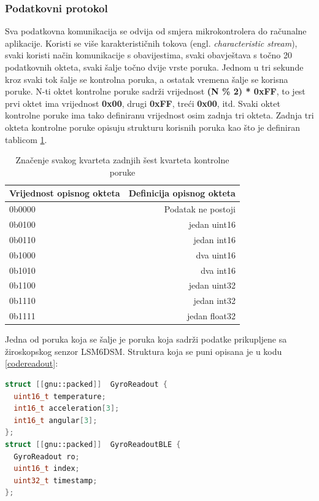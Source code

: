 \documentclass[times, utf8, diplomski]{diplomski}
\begin{document}
\subsubsection{Podatkovni protokol}
Sva podatkovna komunikacija se odvija od smjera mikrokontrolera do računalne aplikacije.
Koristi se više karakterističnih tokova (engl. \textit{characteristic stream}), svaki koristi način komunikacije s obavijestima, svaki obavještava s točno 20 podatkovnih okteta, svaki šalje točno dvije vrste poruka.
Jednom u tri sekunde kroz svaki tok šalje se kontrolna poruka, a ostatak vremena šalje se korisna poruke.
N-ti oktet kontrolne poruke sadrži vrijednost \textbf{(N \% 2) * 0xFF}, to jest prvi oktet ima vrijednost \textbf{0x00}, drugi \textbf{0xFF}, treći \textbf{0x00}, itd.
Svaki oktet kontrolne poruke ima tako definiranu vrijednost osim zadnja tri okteta.
Zadnja tri okteta kontrolne poruke opisuju strukturu korisnih poruka kao što je definiran tablicom \ref{datatable}.

\begin{table}[H]
  \begin{center}
    \begin{tabular}[c]{l|r}
      \multicolumn{1}{c|}{\textbf{Vrijednost opisnog okteta}} & 
      \multicolumn{1}{c}{\textbf{Definicija opisnog okteta}} \\
      \hline
      0b0000 & Podatak ne postoji \\
      0b0100 & jedan uint16 \\
      0b0110 & jedan int16 \\
      0b1000 & dva uint16 \\
      0b1010 & dva int16 \\
      0b1100 & jedan uint32 \\
      0b1110 & jedan int32 \\
      0b1111 & jedan float32 \\
      \hline
    \end{tabular}
  \caption{Značenje svakog kvarteta zadnjih šest kvarteta kontrolne poruke}
  \label{datatable}
  \end{center}
\end{table}

Jedna od poruka koja se šalje je poruka koja sadrži podatke prikupljene sa žiroskopskog senzor LSM6DSM. Struktura koja se puni opisana je u kodu \ref{codereadout}:

\begin{lstlisting}[language=c++, caption = {Definicija strukture koja se šalje Bluetoothom}, label={codereadout}]
 struct [[gnu::packed]]  GyroReadout {
  uint16_t temperature;
  int16_t acceleration[3];
  int16_t angular[3];
};
struct [[gnu::packed]]  GyroReadoutBLE {
  GyroReadout ro;
  uint16_t index;
  uint32_t timestamp;
};
\end{lstlisting}
\end{document}
